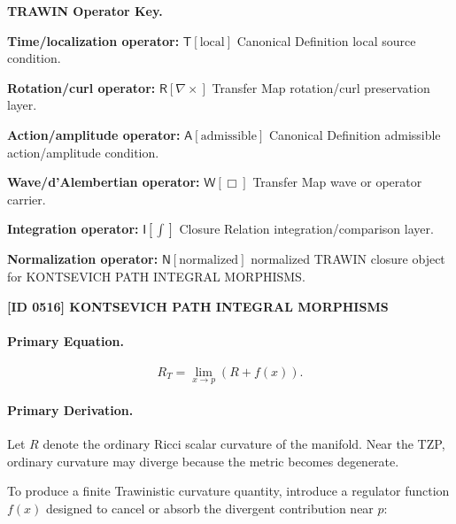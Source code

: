 \par\vspace{0.45\baselineskip}
\noindent\begin{minipage}[t]{\linewidth}
\begingroup
\small
\raggedright
\textbf{TRAWIN Operator Key.}\par
\noindent\textbf{Time/localization operator:} $\mathsf{T}\!\left[\mathrm{local}\right]$ Canonical Definition local source condition.\par
\noindent\textbf{Rotation/curl operator:} $\mathsf{R}\!\left[\nabla\times\right]$ Transfer Map rotation/curl preservation layer.\par
\noindent\textbf{Action/amplitude operator:} $\mathsf{A}\!\left[\mathrm{admissible}\right]$ Canonical Definition admissible action/amplitude condition.\par
\noindent\textbf{Wave/d'Alembertian operator:} $\mathsf{W}\!\left[\Box\right]$ Transfer Map wave or operator carrier.\par
\noindent\textbf{Integration operator:} $\mathsf{I}\!\left[\int\right]$ Closure Relation integration/comparison layer.\par
\noindent\textbf{Normalization operator:} $\mathsf{N}\!\left[\mathrm{normalized}\right]$ normalized TRAWIN closure object for KONTSEVICH PATH INTEGRAL MORPHISMS.\par
\endgroup
\end{minipage}

\clearpage
\noindent\textbf{[ID 0516] KONTSEVICH PATH INTEGRAL MORPHISMS}\par
\vspace{0.35em}
\paragraph{Primary Equation.}
\begin{equation}
R_T
=
\lim_{x\to p}
\left(
R+f(x)
\right).
\end{equation}

\paragraph{Primary Derivation.}
Let $R$ denote the ordinary Ricci scalar curvature of the manifold.  
Near the TZP, ordinary curvature may diverge because the metric becomes degenerate.

To produce a finite Trawinistic curvature quantity, introduce a regulator function $f(x)$ designed to cancel or absorb the divergent contribution near $p$:

